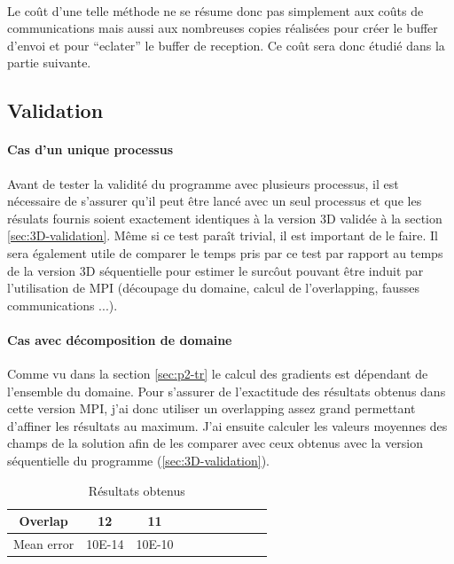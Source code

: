 \paragraph{}Le coût d'une telle méthode ne se résume donc pas simplement aux coûts de communications mais aussi aux nombreuses copies réalisées pour créer le buffer d'envoi et pour ``eclater'' le buffer de reception. Ce coût sera donc étudié dans la partie suivante.

\subsection{Validation}

\paragraph{Cas d'un unique processus}Avant de tester la validité du programme avec plusieurs processus, il est nécessaire de s'assurer qu'il peut être lancé avec un seul processus et que les résulats fournis soient exactement identiques à la version 3D validée à la section \ref{sec:3D-validation}. Même si ce test paraît trivial, il est important de le faire. Il sera également utile de comparer le temps pris par ce test par rapport au temps de la version 3D séquentielle pour estimer le surcôut pouvant être induit par l'utilisation de MPI (découpage du domaine, calcul de l'overlapping, fausses communications ...).

\paragraph{Cas avec décomposition de domaine}
Comme vu dans la section \ref{sec:p2-tr} le calcul des gradients est dépendant de l'ensemble du domaine. Pour s'assurer de l'exactitude des résultats obtenus dans cette version MPI, j'ai donc utiliser un overlapping assez grand permettant d'affiner les résultats au maximum. J'ai ensuite calculer les valeurs moyennes des champs de la solution afin de les comparer avec ceux obtenus avec la version séquentielle du programme (\ref{sec:3D-validation}).

\begin{table}[h]
  \begin{center}
    \begin{tabular}{|c|c|c||c|c|c|c||c|c|c|}
      \hline
      Overlap & 12 & 11 \\
      \hline
      Mean error & 10E-14 & 10E-10 \\
      \hline
    
    \end{tabular}
    \caption{\label{arr:overlap_res} Résultats obtenus}
  \end{center}
\end{table}
